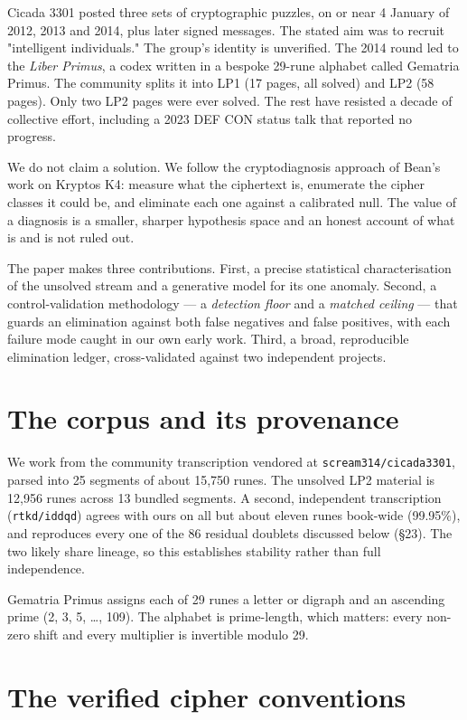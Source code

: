 \documentclass[11pt]{article}
\begin{document}
Cicada 3301 posted three sets of cryptographic puzzles, on or near 4 January of 2012, 2013 and 2014, plus later signed messages. The stated aim was to recruit "intelligent individuals." The group's identity is unverified. The 2014 round led to the \emph{Liber Primus}, a codex written in a bespoke 29-rune alphabet called Gematria Primus. The community splits it into LP1 (17 pages, all solved) and LP2 (58 pages). Only two LP2 pages were ever solved. The rest have resisted a decade of collective effort, including a 2023 DEF CON status talk that reported no progress.


We do not claim a solution. We follow the cryptodiagnosis approach of Bean's work on Kryptos K4: measure what the ciphertext is, enumerate the cipher classes it could be, and eliminate each one against a calibrated null. The value of a diagnosis is a smaller, sharper hypothesis space and an honest account of what is and is not ruled out.


The paper makes three contributions. First, a precise statistical characterisation of the unsolved stream and a generative model for its one anomaly. Second, a control-validation methodology — a \emph{detection floor} and a \emph{matched ceiling} — that guards an elimination against both false negatives and false positives, with each failure mode caught in our own early work. Third, a broad, reproducible elimination ledger, cross-validated against two independent projects.


\section{The corpus and its provenance}

We work from the community transcription vendored at \texttt{scream314/cicada3301}, parsed into 25 segments of about 15,750 runes. The unsolved LP2 material is 12,956 runes across 13 bundled segments. A second, independent transcription (\texttt{rtkd/iddqd}) agrees with ours on all but about eleven runes book-wide (99.95\%), and reproduces every one of the 86 residual doublets discussed below (§23). The two likely share lineage, so this establishes stability rather than full independence.


Gematria Primus assigns each of 29 runes a letter or digraph and an ascending prime (2, 3, 5, …, 109). The alphabet is prime-length, which matters: every non-zero shift and every multiplier is invertible modulo 29.


\section{The verified cipher conventions}
\end{document}
